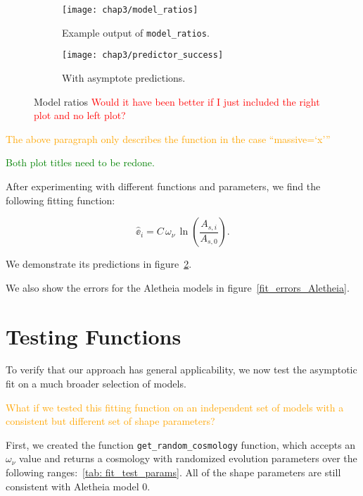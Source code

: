 \begin{figure}[ht!]
    \begin{subfigure}{0.45 \textwidth}
    \centering
 		\texttt{[image: chap3/model\_ratios]}
 		\cprotect\caption{Example output of \verb|model_ratios|.}
 		\label{fig: model_ratios_demo}
    \end{subfigure}
    \begin{subfigure}{0.45 \textwidth}
    \centering
 		\texttt{[image: chap3/predictor\_success]}
 		\caption{With asymptote predictions.}
 		\label{fig: ee_prediction_demo}
    \end{subfigure}
        \centering
    \caption[$\ee$]
    		{Model ratios
    		\textcolor{red}{Would it have been better if I just included the
    		right plot and no left plot?}}
    \label{fig: model_ratios}
\end{figure}

\textcolor{orange}{The above paragraph only describes the function in the
case ``massive=`x'''}

\textcolor{green}{Both plot titles need to be redone.}

After experimenting with different functions and parameters, we find the
following fitting function:

\begin{equation}
\hat{\ee}_i = C \, \omega_\nu \, \ln \left( \frac{A_{s, i}}{A_{s, 0}} \right)
.\end{equation}

We demonstrate its predictions in figure~\ref{fig: ee_prediction_demo}.

We also show the errors for the Aletheia models in
figure~\ref{fit_errors_Aletheia}.

\section{Testing Functions}

To verify that our approach has general applicability, we now test the
asymptotic fit on a much broader selection of models.

\textcolor{orange}{What if we tested this fitting function on an independent
set of models with a consistent but different set of shape parameters?}

First, we created the function \verb|get_random_cosmology| function, which
accepts an $\omega_\nu$ value and returns a cosmology with randomized
evolution parameters over the following ranges:~\ref{tab: fit_test_params}.
All of the shape parameters are still consistent with Aletheia model 0.

